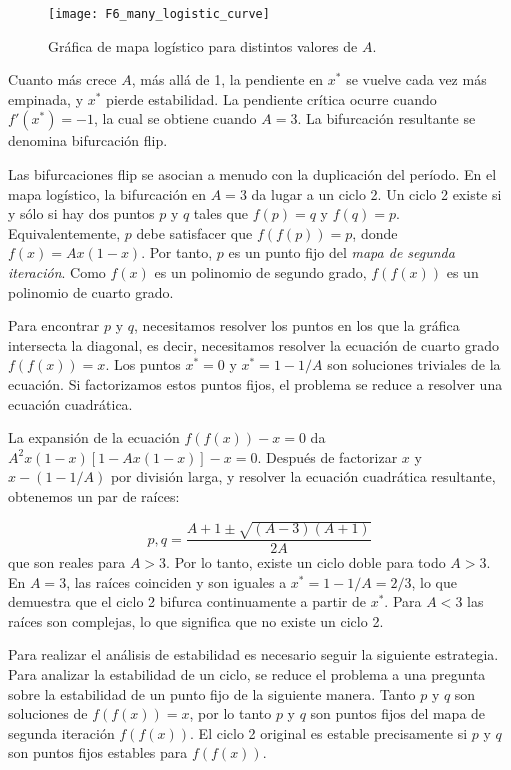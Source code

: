             \begin{figure}[hbtp]
                \caption{Gráfica de mapa logístico para distintos valores de $A$.}
                \centering
                \texttt{[image: F6\_many\_logistic\_curve]}
                \label{fig:F6_many_logistic_curve}
            \end{figure}
            
            Cuanto más crece $A$, más allá de 1, la pendiente en $x^{*}$ se vuelve cada vez más empinada, y $x^{*}$ pierde estabilidad. La pendiente crítica ocurre cuando $f'(x^{*}) = -1$, la cual se obtiene cuando $A = 3$. La bifurcación resultante se denomina bifurcación flip.

            Las bifurcaciones flip se asocian a menudo con la duplicación del período. En el mapa logístico, la bifurcación en $A = 3$ da lugar a un ciclo 2. Un ciclo 2 existe si y sólo si hay dos puntos $p$ y $q$ tales que $f(p) = q$  y $f(q) = p$. Equivalentemente, $p$ debe satisfacer que $f(f(p)) = p$, donde $f(x) = Ax (1 - x)$. Por tanto, $p$ es un punto fijo del \emph{mapa de segunda iteración}. Como $f(x)$ es un polinomio de segundo grado, $f(f(x))$ es un polinomio de cuarto grado.

            Para encontrar $p$ y $q$, necesitamos resolver los puntos en los que la gráfica intersecta la diagonal, es decir, necesitamos resolver la ecuación de cuarto grado $f(f(x)) = x$. Los puntos $x^{*} = 0$ y $x^{*} = 1 - 1/A$ son soluciones triviales de la ecuación. Si factorizamos estos puntos fijos, el problema se reduce a resolver una ecuación cuadrática. 

            La expansión de la ecuación $f(f(x)) -x = 0$ da $A^{2}x(1-x) [1 - Ax(1-x)] -x = 0$. Después de factorizar $x$ y $x - (1-1/A)$ por división larga, y resolver la ecuación cuadrática resultante, obtenemos un par de raíces:

            \begin{equation}
                p,q = \frac{A + 1 \pm \sqrt{(A-3) (A+1)} }{2A} 
            \end{equation}
            que son reales para $A > 3$. Por lo tanto, existe un ciclo doble para todo $ A > 3 $. En $ A = 3 $, las raíces coinciden y son iguales a $x^{*} = 1 - 1/A = 2/3$, lo que demuestra que el ciclo 2 bifurca continuamente a partir de $x^{*}$. Para $A < 3$ las raíces son complejas, lo que significa que no existe un ciclo 2.

             Para realizar el análisis de estabilidad es necesario seguir la siguiente estrategia. Para analizar la estabilidad de un ciclo, se reduce el problema a una pregunta sobre la estabilidad de un punto fijo de la siguiente manera. Tanto $p$ y $q$ son soluciones de $f(f(x)) = x$, por lo tanto $p$ y $q$ son puntos fijos del mapa de segunda iteración $f(f(x))$. El ciclo 2 original es estable precisamente si $p$ y $q$ son puntos fijos estables para $f(f(x))$.

